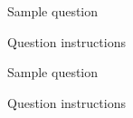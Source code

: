 \documentclass[11pt]{exam}
\begin{document}
\begin{questions}

	\question Sample question


	\quad

	Question instructions

	\begin{framed}


	\end{framed}



	\question Sample question


	\quad

	Question instructions

	\begin{framed}


	\end{framed}

\end{questions}
\end{document}
